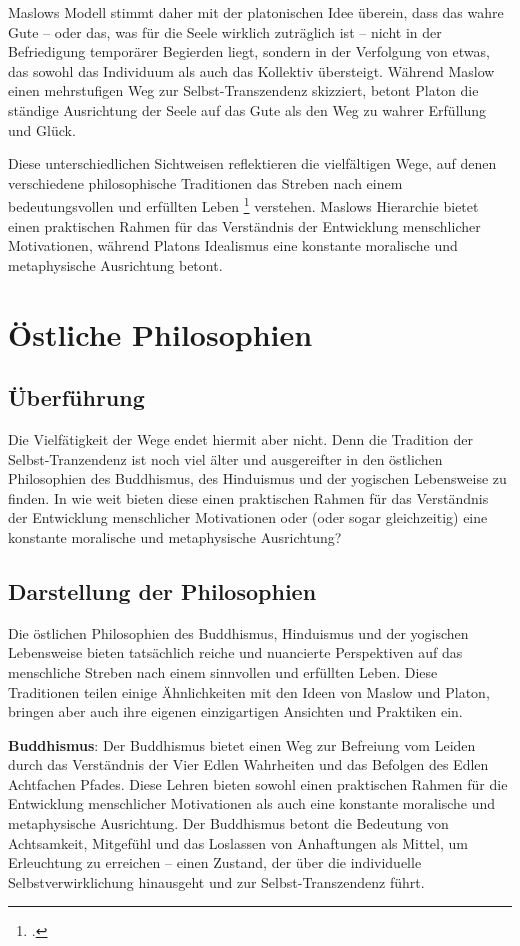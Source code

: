 \documentclass[12pt,a4paper]{article}
\begin{document}
Maslows Modell stimmt daher mit der platonischen Idee überein, dass das wahre Gute – oder das, was für die Seele wirklich zuträglich ist – nicht in der Befriedigung temporärer Begierden liegt, sondern in der Verfolgung von etwas, das sowohl das Individuum als auch das Kollektiv übersteigt. Während Maslow einen mehrstufigen Weg zur Selbst-Transzendenz skizziert, betont Platon die ständige Ausrichtung der Seele auf das Gute als den Weg zu wahrer Erfüllung und Glück.

Diese unterschiedlichen Sichtweisen reflektieren die vielfältigen Wege, auf denen verschiedene philosophische Traditionen das Streben nach einem bedeutungsvollen und erfüllten Leben \footcite{rahula1974, flood1996, feuerstein2001} verstehen. Maslows Hierarchie bietet einen praktischen Rahmen für das Verständnis der Entwicklung menschlicher Motivationen, während Platons Idealismus eine konstante moralische und metaphysische Ausrichtung betont.

\section{Östliche Philosophien}
\subsection[short]{Überführung}
Die Vielfätigkeit der Wege endet hiermit aber nicht. Denn die Tradition der Selbst-Tranzendenz ist noch viel älter und ausgereifter in den östlichen Philosophien des Buddhismus, des Hinduismus und der yogischen Lebensweise zu finden. In wie weit bieten diese einen praktischen Rahmen für das Verständnis der Entwicklung menschlicher Motivationen oder (oder sogar gleichzeitig) eine konstante moralische
und metaphysische Ausrichtung?

\subsection[short]{Darstellung der Philosophien}
Die östlichen Philosophien des Buddhismus, Hinduismus und der yogischen Lebensweise bieten tatsächlich reiche und nuancierte Perspektiven auf das menschliche Streben nach einem sinnvollen und erfüllten Leben. Diese Traditionen teilen einige Ähnlichkeiten mit den Ideen von Maslow und Platon, bringen aber auch ihre eigenen einzigartigen Ansichten und Praktiken ein.

\textbf{Buddhismus}:
Der Buddhismus bietet einen Weg zur Befreiung vom Leiden durch das Verständnis der Vier Edlen Wahrheiten und das Befolgen des Edlen Achtfachen Pfades. Diese Lehren bieten sowohl einen praktischen Rahmen für die Entwicklung menschlicher Motivationen als auch eine konstante moralische und metaphysische Ausrichtung. Der Buddhismus betont die Bedeutung von Achtsamkeit, Mitgefühl und das Loslassen von Anhaftungen als Mittel, um Erleuchtung zu erreichen – einen Zustand, der über die individuelle Selbstverwirklichung hinausgeht und zur Selbst-Transzendenz führt.
\end{document}
